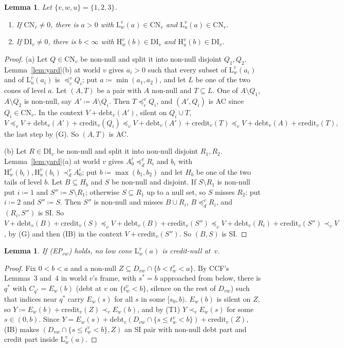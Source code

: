 \documentclass[11pt]{article}
\newtheorem{lemma}[theorem]{Lemma}
\theoremstyle{definition}\newtheorem{definition}[theorem]{Definition}
\theoremstyle{remark}\newtheorem{remark}[theorem]{Remark}
\newcommand{\debt}{\mathrm{debt}}
\newcommand{\cred}{\mathrm{credit}}
\newcommand{\Lo}[3]{\mathrm L^{#1}_{#2}(#3)}
\newcommand{\Hi}[3]{\mathrm H^{#1}_{#2}(#3)}
\newcommand{\CN}{\mathrm{CN}}
\newcommand{\DI}{\mathrm{DI}}
\begin{document}
\begin{lemma}\label{lem:conestails}
Let $\{v,w,u\}=\{1,2,3\}$.
\begin{enumerate}[label=(\alph*)]
\item If $\CN_v\ne0$, there is $a>0$ with $\Lo vwa\in\CN_v$ and
$\Lo vua\in\CN_v$.
\item If $\DI_v\ne0$, there is $b<\infty$ with $\Hi vwb\in\DI_v$ and
$\Hi vub\in\DI_v$.
\end{enumerate}
\end{lemma}
\begin{proof}
(a) Let $Q\in\CN_v$ be non-null and split it into non-null disjoint
$Q_1,Q_2$. Lemma~\ref{lem:yard}(b) at world $v$ gives $a_i>0$ such that
every subset of $\Lo vw{a_i}$ and of $\Lo vu{a_i}$ is $\preceq^v_cQ_i$; put
$a\coloneqq\min(a_1,a_2)$, and let $L$ be one of the two cones of level $a$.
Let $(A,T)$ be a pair with $A$ non-null and $T\subseteq L$. One of
$A\setminus Q_1$, $A\setminus Q_2$ is non-null, say $A'\coloneqq A\setminus
Q_i$. Then $T\preceq^v_cQ_i$, and $(A',Q_i)$ is AC since $Q_i\in\CN_v$. In
the context $V+\debt_v(A')$, silent on $Q_i\cup T$,
\[
 V\preceq_vV+\debt_v(A')+\cred_v(Q_i)\preceq_vV+\debt_v(A')+\cred_v(T)
 \preceq_vV+\debt_v(A)+\cred_v(T),
\]
the last step by (G). So $(A,T)$ is AC.

(b) Let $R\in\DI_v$ be non-null and split it into non-null disjoint
$R_1,R_2$. Lemma~\ref{lem:yard}(a) at world $v$ gives $A^i_0\preceq^v_dR_i$
and $b_i$ with $\Hi vw{b_i},\Hi vu{b_i}\prec^v_dA^i_0$; put
$b\coloneqq\max(b_1,b_2)$ and let $H_b$ be one of the two tails of level
$b$. Let $B\subseteq H_b$ and $S$ be non-null and disjoint. If $S\setminus
R_1$ is non-null put $i\coloneqq1$ and $S''\coloneqq S\setminus R_1$;
otherwise $S\subseteq R_1$ up to a null set, so $S$ misses $R_2$: put
$i\coloneqq2$ and $S''\coloneqq S$. Then $S''$ is non-null and misses
$B\cup R_i$, $B\preceq^v_dR_i$, and $(R_i,S'')$ is SI. So
$V+\debt_v(B)+\cred_v(S)\preceq_vV+\debt_v(B)+\cred_v(S'')\preceq_v
V+\debt_v(R_i)+\cred_v(S'')\prec_vV$, by (G) and then (IB) in the context
$V+\cred_v(S'')$. So $(B,S)$ is SI.
\end{proof}

\begin{lemma}\label{lem:EPnotCN}
If (EP$_{vw}$) holds, no low cone $\Lo vwa$ is credit-null at~$v$.
\end{lemma}
\begin{proof}
Fix $0<b<a$ and a non-null $Z\subseteq D_{vw}\cap\{b<t^v_w<a\}$. By CCF's
Lemmas~3 and~4 in world $v$'s frame, with $s^*=b$ approached from below,
there is $q^*$ with $C_{q^*}=E_w(b)$ (debt at $v$ on $\{t^v_w<b\}$, silence
on the rest of $D_{vw}$) such that indices near $q^*$ carry $E_w(s)$ for all
$s$ in some $[s_0,b)$. $E_w(b)$ is silent on $Z$, so
$Y\coloneqq E_w(b)+\cred_v(Z)\prec_vE_w(b)$, and by (T1) $Y\prec_vE_w(s)$ for
some $s\in(0,b)$. Since $Y=E_w(s)+\debt_v(D_{vw}\cap\{s\le t^v_w<b\})
+\cred_v(Z)$, (IB) makes $(D_{vw}\cap\{s\le t^v_w<b\},Z)$ an SI pair with
non-null debt part and credit part inside $\Lo vwa$.
\end{proof}
\end{document}

